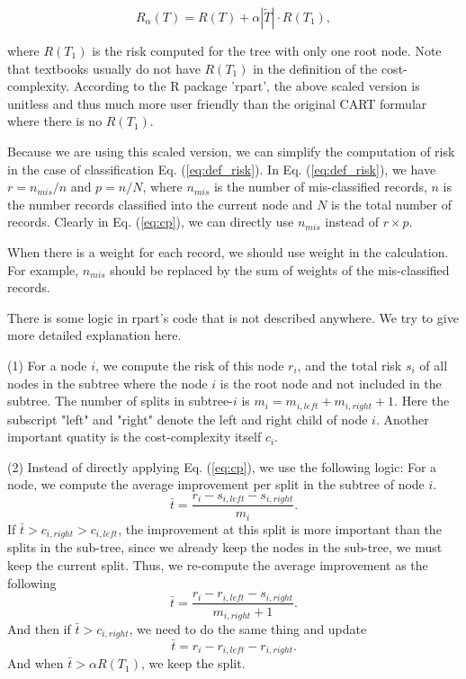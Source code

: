 \begin{equation}
    \label{eq:cp}
    R_{\alpha}(T) = R(T) + \alpha |\tilde{T}|\cdot R(T_1),
\end{equation}

where $R(T_1)$ is the risk computed for the tree with only one root
node. Note that textbooks usually do not have $R(T_1)$ in the
definition of the cost-complexity. According to the R package 'rpart',
the above scaled version is unitless and thus much more user friendly
than the original CART formular where there is no $R(T_1)$.

Because we are using this scaled version, we can simplify the
computation of risk in the case of classification Eq.
(\ref{eq:def_risk}). In Eq. (\ref{eq:def_risk}), we have $r =
n_{mis}/n$ and $p = n/N$, where $n_{mis}$ is the number of
mis-classified records, $n$ is the number records classified into the
current node and $N$ is the total number of records. Clearly in Eq.
(\ref{eq:cp}), we can directly use $n_{mis}$ instead of $r \times p$.

When there is a weight for each record, we should use weight in the
calculation. For example, $n_{mis}$ should be replaced by the sum of
weights of the mis-classified records.

There is some logic in rpart's code that is not described anywhere. We
try to give more detailed explanation here.

(1) For a node $i$, we compute the risk of this node $r_i$, and the
total risk $s_i$ of all nodes in the subtree where the node $i$ is the
root node and not included in the subtree. The number of splits in
subtree-$i$ is $m_i = m_{i,left} + m_{i,right} + 1$. Here the
subscript "left" and "right" denote the left and right child of node
$i$. Another important quatity is the cost-complexity itself $c_i$.

(2) Instead of directly applying Eq. (\ref{eq:cp}), we use the
following logic: For a node, we compute the average improvement per
split in the subtree of node $i$.
\begin{equation}
    \bar{t} = \frac{r_i - s_{i,left} - s_{i,right}}{m_i}.
\end{equation}
If $\bar{t} > c_{i,right} > c_{i,left}$, the improvement at this split
is more important than the splits in the sub-tree, since we already
keep the nodes in the sub-tree, we must keep the current split. Thus,
we re-compute the average improvement as the following
\begin{equation}
    \bar{t} = \frac{r_i - r_{i,left} - s_{i,right}}{m_{i,right} + 1} .
\end{equation}
And then if $\bar{t} > c_{i,right} $, we need to do the same thing and
update
\begin{equation}
    \bar{t} = r_i - r_{i,left} - r_{i,right} .
\end{equation}
And when $\bar{t} > \alpha R(T_1) $, we keep the split.


